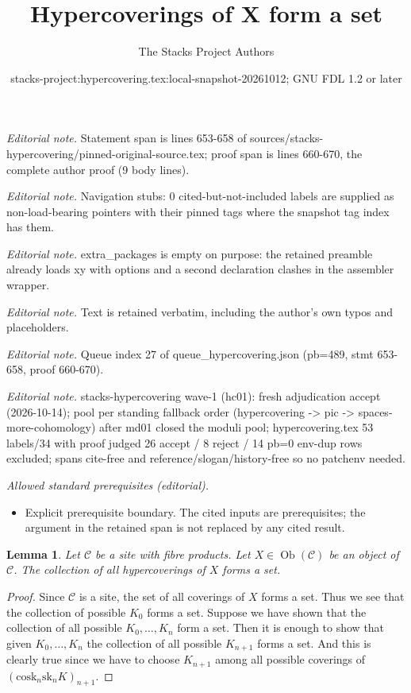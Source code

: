 \documentclass[10pt,a4paper]{amsart}
\title{Hypercoverings of X form a set}
\author{The Stacks Project Authors}
\date{stacks-project:hypercovering.tex:local-snapshot-20261012; GNU FDL 1.2 or later}
\theoremstyle{plain}
\newtheorem{lemma}[subsection]{Lemma}
\theoremstyle{definition}
\theoremstyle{remark}
\numberwithin{equation}{subsection}
\def\Ob{\mathop{\mathrm{Ob}}\nolimits}
\begin{document}
\maketitle
\noindent\textit{Editorial note.} Statement span is lines 653-658 of sources/stacks-hypercovering/pinned-original-source.tex; proof span is lines 660-670, the complete author proof (9 body lines).\par\medskip
\noindent\textit{Editorial note.} Navigation stubs: 0 cited-but-not-included labels are supplied as non-load-bearing pointers with their pinned tags where the snapshot tag index has them.\par\medskip
\noindent\textit{Editorial note.} extra\_packages is empty on purpose: the retained preamble already loads xy with options and a second declaration clashes in the assembler wrapper.\par\medskip
\noindent\textit{Editorial note.} Text is retained verbatim, including the author's own typos and placeholders.\par\medskip
\noindent\textit{Editorial note.} Queue index 27 of queue\_hypercovering.json (pb=489, stmt 653-658, proof 660-670).\par\medskip
\noindent\textit{Editorial note.} stacks-hypercovering wave-1 (hc01): fresh adjudication accept (2026-10-14); pool per standing fallback order (hypercovering -> pic -> spaces-more-cohomology) after md01 closed the moduli pool; hypercovering.tex 53 labels/34 with proof judged 26 accept / 8 reject / 14 pb=0 env-dup rows excluded; spans cite-free and reference/slogan/history-free so no patchenv needed.\par\medskip
\noindent\textit{Allowed standard prerequisites (editorial).}\begin{itemize}
\item Explicit prerequisite boundary. The cited inputs are prerequisites; the argument in the retained span is not replaced by any cited result.
\end{itemize}\medskip
\begin{lemma}
\label{lemma-hypercoverings-set}
Let $\mathcal{C}$ be a site with fibre products.
Let $X \in \Ob(\mathcal{C})$ be an object of $\mathcal{C}$.
The collection of all hypercoverings of $X$ forms a set.
\end{lemma}

\begin{proof}
Since $\mathcal{C}$ is a site, the set of all coverings of
$X$ forms a set. Thus we see that the collection
of possible $K_0$ forms a set. Suppose we have shown that
the collection of all possible $K_0, \ldots, K_n$ form
a set. Then it is enough to show that given
$K_0, \ldots, K_n$ the collection of all possible
$K_{n + 1}$ forms a set. And this is clearly true since
we have to choose $K_{n + 1}$ among all possible coverings
of $(\text{cosk}_n \text{sk}_n K)_{n + 1}$.
\end{proof}
\end{document}
